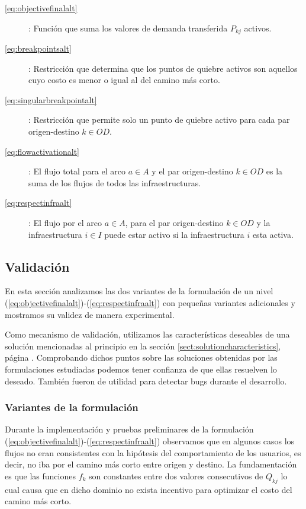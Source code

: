 \documentclass{article}
\begin{document}
  \begin{description}
    \item[\ref{eq:objectivefinalalt}]: Función que suma los valores de demanda transferida $P_{kj}$ activos.
    \item[\ref{eq:breakpointsalt}]: Restricción que determina que los puntos de quiebre activos son aquellos cuyo costo es menor o igual al del camino más corto.
    \item[\ref{eq:singularbreakpointalt}]: Restricción que permite solo un punto de quiebre activo para cada par origen-destino $k \in OD$.
    \item[\ref{eq:flowactivationalt}]: El flujo total para el arco $a \in A$ y el par origen-destino $k \in OD$ es la suma de los flujos de todos las infraestructuras.
    \item[\ref{eq:respectinfraalt}]: El flujo por el arco $a \in A$, para el par origen-destino $k \in OD$ y la infraestructura $i \in I$ puede estar activo si la infraestructura $i$ esta activa.
  \end{description}

  \subsection{Validación}

  En esta sección analizamos las dos variantes de la formulación de un nivel (\ref{eq:objectivefinalalt})-(\ref{eq:respectinfraalt}) con pequeñas variantes adicionales y mostramos su validez de manera experimental.

  Como mecanismo de validación, utilizamos las características deseables de una solución mencionadas al principio en la sección \ref{sect:solutioncharacteristics}, página \pageref{sect:solutioncharacteristics}. Comprobando dichos puntos sobre las soluciones obtenidas por las formulaciones estudiadas podemos tener confianza de que ellas resuelven lo deseado. También fueron de utilidad para detectar bugs durante el desarrollo.

  \subsubsection{Variantes de la formulación}

  Durante la implementación y pruebas preliminares de la formulación (\ref{eq:objectivefinalalt})-(\ref{eq:respectinfraalt}) observamos que en algunos casos los flujos no eran consistentes con la hipótesis del comportamiento de los usuarios, es decir, no iba por el camino más corto entre origen y destino. La fundamentación es que las funciones $f_k$ son constantes entre dos valores consecutivos de $Q_{kj}$ lo cual causa que en dicho dominio no exista incentivo para optimizar el costo del camino más corto.
\end{document}
